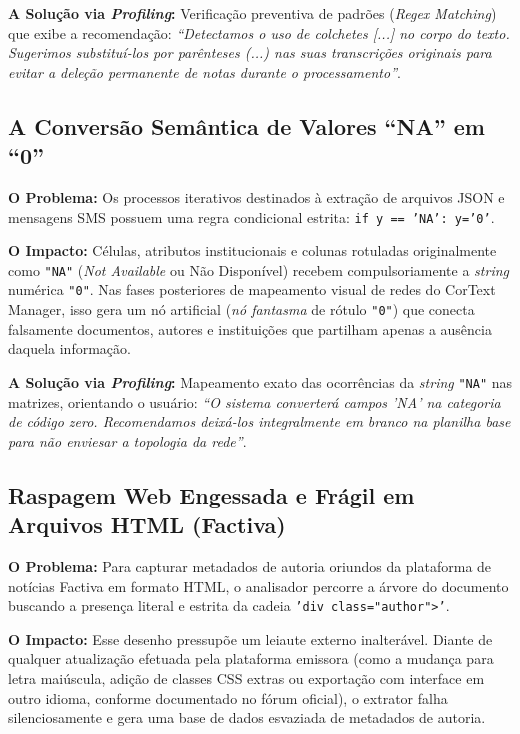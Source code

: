 \documentclass[
	oneside,
	a4paper,
	12pt,
	chapter=TITLE,
	section=TITLE,
	english,
	brazilian
]{abntex2}
\begin{document}
\begin{apendicesenv}
\textbf{A Solução via \textit{Profiling}:} Verificação preventiva de padrões (\textit{Regex Matching}) que exibe a recomendação: \textit{``Detectamos o uso de colchetes [...] no corpo do texto. Sugerimos substituí-los por parênteses (...) nas suas transcrições originais para evitar a deleção permanente de notas durante o processamento''}.

\FloatBarrier
\subsection{A Conversão Semântica de Valores ``NA'' em ``0''}\label{sec:a_conversao_semantica_de_valores_na_em_0}


\textbf{O Problema:} Os processos iterativos destinados à extração de arquivos JSON e mensagens SMS possuem uma regra condicional estrita: \texttt{if y == 'NA': y='0'}.

\textbf{O Impacto:} Células, atributos institucionais e colunas rotuladas originalmente como \texttt{"NA"} (\textit{Not Available} ou Não Disponível) recebem compulsoriamente a \textit{string} numérica \texttt{"0"}. Nas fases posteriores de mapeamento visual de redes do CorText Manager, isso gera um nó artificial (\textit{nó fantasma} de rótulo \texttt{"0"}) que conecta falsamente documentos, autores e instituições que partilham apenas a ausência daquela informação.

\textbf{A Solução via \textit{Profiling}:} Mapeamento exato das ocorrências da \textit{string} \texttt{"NA"} nas matrizes, orientando o usuário: \textit{``O sistema converterá campos 'NA' na categoria de código zero. Recomendamos deixá-los integralmente em branco na planilha base para não enviesar a topologia da rede''}.

\FloatBarrier
\subsection{Raspagem Web Engessada e Frágil em Arquivos HTML (Factiva)}\label{sec:raspagem_web_engessada_e_fragil_em_arqui}


\textbf{O Problema:} Para capturar metadados de autoria oriundos da plataforma de notícias Factiva em formato HTML, o analisador percorre a árvore do documento buscando a presença literal e estrita da cadeia \texttt{'div class="author">'}.

\textbf{O Impacto:} Esse desenho pressupõe um leiaute externo inalterável. Diante de qualquer atualização efetuada pela plataforma emissora (como a mudança para letra maiúscula, adição de classes CSS extras ou exportação com interface em outro idioma, conforme documentado no fórum oficial), o extrator falha silenciosamente e gera uma base de dados esvaziada de metadados de autoria.


\end{apendicesenv}
\end{document}
